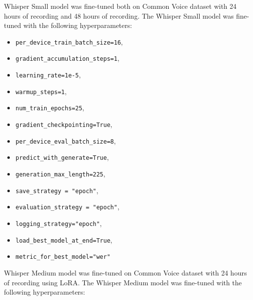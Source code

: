 \documentclass[conference]{IEEEtran}
\begin{document}
Whisper Small model was fine-tuned both on Common Voice dataset with 24 hours of recording and 48 hours of recording. The Whisper Small model was fine-tuned with the following hyperparameters:

\begin{itemize}
    \item \texttt{per\_device\_train\_batch\_size=16},
    \item \texttt{gradient\_accumulation\_steps=1},
    \item \texttt{learning\_rate=1e-5},
    \item \texttt{warmup\_steps=1},
    \item \texttt{num\_train\_epochs=25},
    \item \texttt{gradient\_checkpointing=True},
    \item \texttt{per\_device\_eval\_batch\_size=8},
    \item \texttt{predict\_with\_generate=True},
    \item \texttt{generation\_max\_length=225},
    \item \texttt{save\_strategy = "epoch"},
    \item \texttt{evaluation\_strategy = "epoch"},
    \item \texttt{logging\_strategy="epoch"},
    \item \texttt{load\_best\_model\_at\_end=True},
    \item \texttt{metric\_for\_best\_model="wer"}
    \end{itemize}

\quad \quad Whisper Medium model was fine-tuned on Common Voice dataset with 24 hours of recording using LoRA. The Whisper Medium model was fine-tuned with the following hyperparameters:
\end{document}
